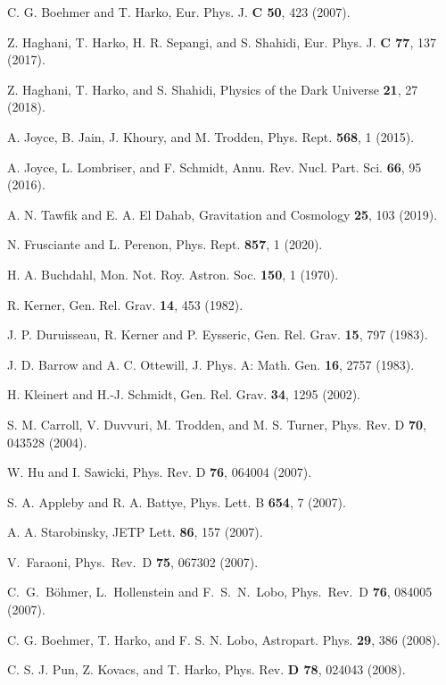 \documentclass[aps,superscriptaddress, showpacs,preprintnumbers, superscriptaddress, nofootinbibt,twocolumn]{revtex4}
\begin{document}
\begin{thebibliography}{99}
 C. G. Boehmer and T. Harko, Eur. Phys. J. {\bf C 50}, 423 (2007).

 Z. Haghani, T. Harko, H. R. Sepangi, and S. Shahidi, Eur. Phys. J. {\bf C  77}, 137 (2017).

 Z. Haghani, T. Harko, and S. Shahidi, Physics of the Dark Universe {\bf  21},  27 (2018).

 A. Joyce, B. Jain, J. Khoury, and M. Trodden,  Phys. Rept. {\bf 568},  1 (2015).

 A. Joyce, L. Lombriser, and F. Schmidt, Annu. Rev. Nucl. Part. Sci. {\bf 66}, 95 (2016).

 A. N. Tawfik and E. A. El Dahab, Gravitation and Cosmology {\bf  25}, 103 (2019).

 N. Frusciante and L. Perenon, Phys. Rept. {\bf 857},  1 (2020).

 H. A. Buchdahl, Mon. Not. Roy. Astron. Soc. \textbf{150}, 1
(1970).

 R. Kerner, Gen. Rel. Grav. \textbf{14}, 453 (1982).

 J. P. Duruisseau, R. Kerner and P. Eysseric, Gen. Rel. Grav. \textbf{15}, 797
(1983).

 J. D. Barrow and A. C. Ottewill, J. Phys. A: Math. Gen. \textbf{16},
2757 (1983).

 H. Kleinert and H.-J. Schmidt, Gen. Rel. Grav. \textbf{34},
1295 (2002).

 S. M. Carroll, V. Duvvuri, M. Trodden, and M. S.
Turner, Phys. Rev. D \textbf{70}, 043528 (2004).

 W. Hu and I. Sawicki, Phys. Rev. D {\bf 76}, 064004 (2007).

  S. A. Appleby and R. A. Battye, Phys. Lett. B {\bf 654}, 7 (2007).

 A. A. Starobinsky, JETP Lett. {\bf 86}, 157 (2007).

 V.~Faraoni, Phys.\ Rev.\ D \textbf{75}, 067302
(2007).

 C.~G.~B\"ohmer, L.~Hollenstein and F.~S.~N.~Lobo, Phys.\ Rev.\ D
\textbf{76}, 084005 (2007).

 C. G. Boehmer, T. Harko, and F. S. N. Lobo, Astropart. Phys. {\bf 29}, 386 (2008).

  C. S. J. Pun, Z. Kovacs, and T. Harko, Phys. Rev. \textbf{D 78}, 024043 (2008).


\end{thebibliography}
\end{document}
